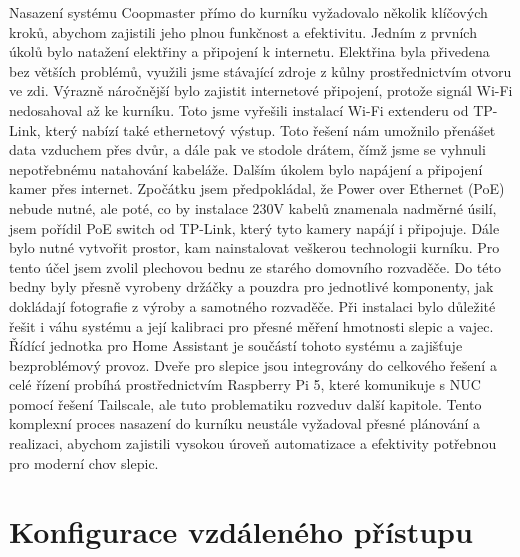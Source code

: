 Nasazení systému Coopmaster přímo do kurníku vyžadovalo několik klíčových kroků, abychom zajistili jeho plnou funkčnost a efektivitu.
Jedním z prvních úkolů bylo natažení elektřiny a připojení k internetu.
Elektřina byla přivedena bez větších problémů, využili jsme stávající zdroje z kůlny prostřednictvím otvoru ve zdi.
\newline
Výrazně náročnější bylo zajistit internetové připojení, protože signál Wi-Fi nedosahoval až ke kurníku.
Toto jsme vyřešili instalací Wi-Fi extenderu od TP-Link, který nabízí také ethernetový výstup.
Toto řešení nám umožnilo přenášet data vzduchem přes dvůr, a dále pak ve stodole drátem, čímž jsme se vyhnuli nepotřebnému natahování kabeláže.
\newline
Dalším úkolem bylo napájení a připojení kamer přes internet.
Zpočátku jsem předpokládal, že Power over Ethernet (PoE) nebude nutné, ale poté, co by instalace 230V kabelů znamenala nadměrné úsilí, jsem pořídil PoE switch od TP-Link, který tyto kamery napájí i připojuje.
\newline
Dále bylo nutné vytvořit prostor, kam nainstalovat veškerou technologii kurníku.
Pro tento účel jsem zvolil plechovou bednu ze starého domovního rozvaděče.
Do této bedny byly přesně vyrobeny držáčky a pouzdra pro jednotlivé komponenty, jak dokládají fotografie z výroby a samotného rozvaděče.
\newline
Při instalaci bylo důležité řešit i váhu systému a její kalibraci pro přesné měření hmotnosti slepic a vajec.
Řídící jednotka pro Home Assistant je součástí tohoto systému a zajišťuje bezproblémový provoz.
Dveře pro slepice jsou integrovány do celkového řešení a celé řízení probíhá prostřednictvím Raspberry Pi 5, které komunikuje s NUC pomocí řešení Tailscale, ale tuto problematiku rozveduv další kapitole.
\newline
Tento komplexní proces nasazení do kurníku neustále vyžadoval přesné plánování a realizaci, abychom zajistili vysokou úroveň automatizace a efektivity potřebnou pro moderní chov slepic.

\newpage


\section{Konfigurace vzdáleného přístupu}\label{sec:konfigurace-vzdaleneho-pristupu}

